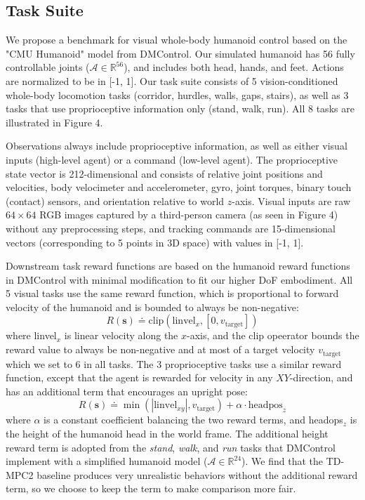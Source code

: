 \documentclass[sn-mathphys-num]{sn-jnl}%
\theoremstyle{thmstyleone}%
\theoremstyle{thmstyletwo}%
\theoremstyle{thmstylethree}%
\begin{document}
\subsection{Task Suite}
We propose a benchmark for visual whole-body humanoid control based on the "CMU Humanoid" model from DMControl.
Our simulated humanoid has 56 fully controllable joints ($ \mathcal{A} \in \mathbb{R}^{56} $),
and includes both head, hands, and feet.
Actions are normalized to be in [-1, 1].
Our task suite consists of 5 vision-conditioned whole-body locomotion tasks (corridor, hurdles, walls, gaps, stairs), as well as 3 tasks that use proprioceptive information only (stand, walk, run).
All 8 tasks are illustrated in Figure 4.


Observations always include proprioceptive information, as well as either visual inputs (high-level agent) or a command (low-level agent).
The proprioceptive state vector is 212-dimensional and consists of relative joint positions and velocities, body velocimeter and accelerometer, gyro, joint torques, binary touch (contact) sensors, and orientation relative to world $ z $-axis.
Visual inputs are raw $ 64 \times 64 $ RGB images captured by a third-person camera (as seen in Figure 4) without any preprocessing steps,
and tracking commands are 15-dimensional vectors (corresponding to 5 points in 3D space) with values in [-1, 1].


Downstream task reward functions are based on the humanoid reward functions in DMControl with minimal modification to fit our higher DoF embodiment.
All 5 visual tasks use the same reward function, which is proportional to forward velocity of the humanoid and is bounded to always be non-negative:
\begin{equation}\label{eq:visual_reward}
	R(\mathbf{s}) \doteq 
		\text{clip} ( \text{linvel}_x, [0, v_\text{target}] )
\end{equation}
% 
where linvel$ _x $ is linear velocity along the $ x $-axis, 
and the clip opeerator bounds the reward value to always be non-negative 
and at most of a target velocity $ v_\text{target} $ which we set to 6 in all tasks.
The 3 proprioceptive tasks use a similar reward function, except that the agent is rewarded for velocity in any $ XY $-direction,
and has an additional term that encourages an upright pose:
\begin{equation}\label{eq:proprioceptive_reward}
	R(\mathbf{s}) \doteq
		\min ( | \text{linvel}_{xy} |, v_\text{target} )
		+ \alpha \cdot \text{headpos}_z
\end{equation}
%
where $ \alpha $ is a constant coefficient balancing the two reward terms, and headops$ _z $ is the height of the humanoid head in the world frame.
The additional height reward term is adopted from the \textit{stand}, \textit{walk}, and \textit{run} tasks that DMControl implement with a simplified humanoid model ($ \mathcal{A} \in \mathbb{R}^{24} $).
We find that the TD-MPC2 baseline produces very unrealistic behaviors without the additional reward term, so we choose to keep the term to make comparison more fair.
\end{document}
